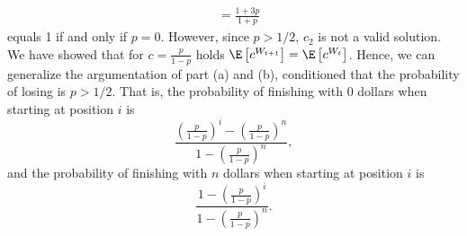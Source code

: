 \begin{enumerate}
\begin{align*}
      &= \frac{1 + 3p}{1 + p}
  \end{align*}
  equals 1 if and only if $p = 0$. However, since $p > 1/2$, $c_2$ is not a valid
  solution. \\
  We have showed that for $c = \frac{p}{1-p}$ holds
  $\E\left[c^{W_{t+1}}\right] = \E\left[c^{W_t}\right]$. Hence, we can generalize
  the argumentation of part (a) and (b), conditioned that the probability of
  losing is $p > 1/2$. That is, the probability of finishing with 0 dollars when
  starting at position $i$ is
  \[  \frac{ \left(\frac{p}{1-p}\right)^i - \left(\frac{p}{1-p}\right)^n}{1 - \left(\frac{p}{1-p}\right)^n}, \]
  and the probability of finishing with $n$ dollars when starting at position
  $i$ is
  \[ \frac{1-\left(\frac{p}{1-p}\right)^i}{1-\left(\frac{p}{1-p}\right)^n}. \]

\end{enumerate}
